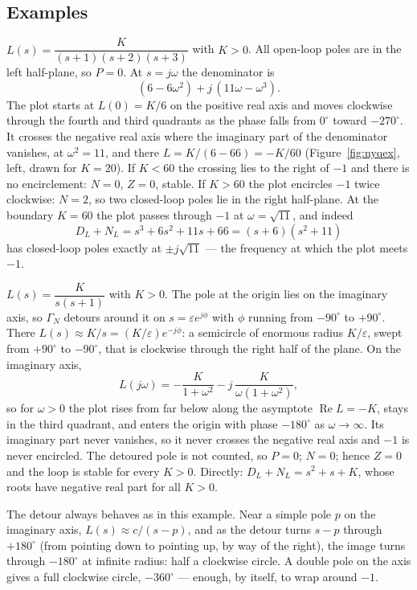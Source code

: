 \documentclass[11pt]{article}
\begin{document}
\subsection{Examples}
\begin{example}\label{ex:nyq1}
$L(s)=\dfrac{K}{(s+1)(s+2)(s+3)}$ with $K>0$. All open-loop poles are in the left
half-plane, so $P=0$. At $s=j\omega$ the denominator is
\[
   (6-6\omega^{2}) + j\,(11\omega-\omega^{3}) .
\]
The plot starts at $L(0)=K/6$ on the positive real axis and moves clockwise through
the fourth and third quadrants as the phase falls from $0^\circ$ toward
$-270^\circ$. It crosses the negative real axis where the imaginary part of the
denominator vanishes, at $\omega^{2}=11$, and there $L=K/(6-66)=-K/60$
(Figure~\ref{fig:nyqex}, left, drawn for $K=20$). If $K<60$ the crossing lies to the
right of $-1$ and there is no encirclement: $N=0$, $Z=0$, stable. If $K>60$ the plot
encircles $-1$ twice clockwise: $N=2$, so two closed-loop poles lie in the right
half-plane. At the boundary $K=60$ the plot passes through $-1$ at
$\omega=\sqrt{11}$, and indeed
\[
   D_L+N_L = s^{3}+6s^{2}+11s+66 = (s+6)(s^{2}+11)
\]
has closed-loop poles exactly at $\pm j\sqrt{11}$ --- the frequency at which the plot
meets $-1$.
\end{example}

\begin{example}\label{ex:nyq2}
$L(s)=\dfrac{K}{s(s+1)}$ with $K>0$. The pole at the origin lies on the imaginary
axis, so $\Gamma_N$ detours around it on $s=\varepsilon e^{j\phi}$ with $\phi$
running from $-90^\circ$ to $+90^\circ$. There $L(s)\approx K/s =
(K/\varepsilon)e^{-j\phi}$: a semicircle of enormous radius $K/\varepsilon$, swept
from $+90^\circ$ to $-90^\circ$, that is clockwise through the right half of the
plane. On the imaginary axis,
\[
   L(j\omega) = -\frac{K}{1+\omega^{2}} - j\,\frac{K}{\omega(1+\omega^{2})},
\]
so for $\omega>0$ the plot rises from far below along the asymptote
$\operatorname{Re}L=-K$, stays in the third quadrant, and enters the origin with
phase $-180^\circ$ as $\omega\to\infty$. Its imaginary part never vanishes, so it
never crosses the negative real axis and $-1$ is never encircled. The detoured pole
is not counted, so $P=0$; $N=0$; hence $Z=0$ and the loop is stable for every
$K>0$. Directly: $D_L+N_L=s^{2}+s+K$, whose roots have negative real part for all
$K>0$.
\end{example}

The detour always behaves as in this example. Near a simple pole $p$ on the
imaginary axis, $L(s)\approx c/(s-p)$, and as the detour turns $s-p$ through
$+180^\circ$ (from pointing down to pointing up, by way of the right), the image
turns through $-180^\circ$ at infinite radius: half a clockwise circle. A double
pole on the axis gives a full clockwise circle, $-360^\circ$ --- enough, by itself,
to wrap around $-1$.
\end{document}
